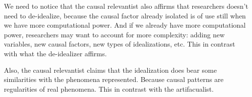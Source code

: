We need to notice that the causal relevantist also affirms that researchers doesn't need to de-idealize, because the causal factor already isolated is of use still when we have more computational power.
And if we already have more computational power, researchers may want to account for more complexity: adding new variables, new causal factors, new types of idealizations, etc.
This in contrast with what the de-idealizer affirms.

Also, the causal relevantist claims that the idealization does bear some similarities with the phenomena represented.
Because causal patterns are regularities of real phenomena.
This in contrast with the artifacualist.






